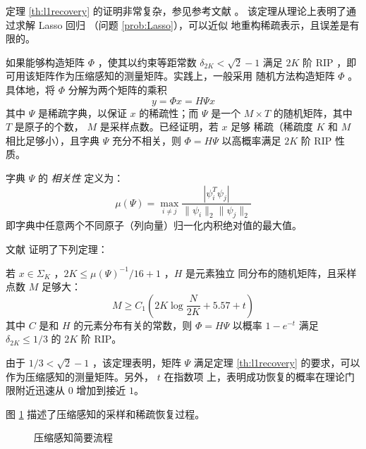 定理 \ref{th:l1recovery} 的证明非常复杂，参见参考文献 \cite{RIPimplieCS}。
该定理从理论上表明了通过求解 Lasso 回归 （问题 \ref{prob:Lasso}），可以近似
地重构稀疏表示，且误差是有限的。

如果能够构造矩阵 $\Phi$ ，使其以约束等距常数 $\delta_{2K} < \sqrt{2}-1$
满足 $2K$ 阶 RIP ，即可用该矩阵作为压缩感知的测量矩阵。实践上，一般采用
随机方法构造矩阵 $\Phi$ 。具体地，将 $\Phi$ 分解为两个矩阵的乘积
\begin{equation}
y = \Phi x = H \Psi x
\end{equation}
其中 $\Psi$ 是稀疏字典，以保证 $x$ 的稀疏性；而 $\Psi$ 是一个 $M \times T$
的随机矩阵，其中 $T$ 是原子的个数， $M$ 是采样点数。已经证明，若 $x$ 足够
稀疏（稀疏度 $K$ 和 $M$ 相比足够小），且字典 $\Psi$ 充分不相关，则
$\Phi = H \Psi$ 以高概率满足 $2K$ 阶 RIP 性质。
\begin{definition}[相关性]
字典 $\Psi$ 的 \emph{相关性} 定义为：
\begin{equation}
\mu(\Psi) = \max_{i \neq j} \frac{|\psi_i^T \psi_j|}{\|\psi_i\|_2
\|\psi_j\|_2}
\end{equation}
即字典中任意两个不同原子（列向量）归一化内积绝对值的最大值。
\end{definition}

文献 \cite{CSRedundant} 证明了下列定理：
\begin{theorem} \label{th:RandomRIP}
若 $x \in \Sigma_K$ ，$2K \leq \mu(\Psi)^{-1}/16+1$ ，$H$ 是元素独立
同分布的随机矩阵，且采样点数 $M$ 足够大：
\begin{equation}
M \geq C_1(2K \log \frac{N}{2K} + 5.57 + t)
\end{equation}
其中 $C$ 是和 $H$ 的元素分布有关的常数，则 $\Phi = H \Psi$ 以概率
$1 - e^{-t}$ 满足 $\delta_{2K} \leq 1/3$ 的 $2K$ 阶 RIP。
\end{theorem}

由于 $1/3 < \sqrt{2} - 1$ ，该定理表明，矩阵 $\Psi$ 满足定理
\ref{th:l1recovery} 的要求，可以作为压缩感知的测量矩阵。另外， $t$ 在指数项
上，表明成功恢复的概率在理论门限附近迅速从 $0$ 增加到接近 $1$。

图 \ref{fig:CS} 描述了压缩感知的采样和稀疏恢复过程。

\begin{figure}
\centering
{} %
\caption{压缩感知简要流程}
\label{fig:CS}
\end{figure}

